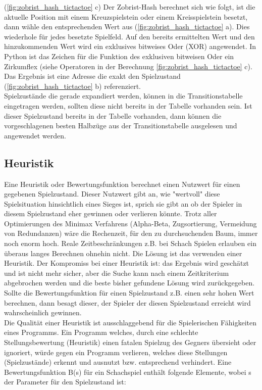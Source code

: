 (\ref{fig:zobrist_hash_tictactoe} c) Der Zobrist-Hash berechnet sich wie folgt, ist die aktuelle Position mit einem Kreuzspielstein oder einem Kreisspielstein besetzt, dann wähle den entsprechenden Wert aus (\ref{fig:zobrist_hash_tictactoe} a). Dies wiederhole für jedes besetzte Spielfeld. Auf den bereits ermittelten Wert und den hinzukommenden Wert wird ein exklusives bitweises Oder (XOR) angewendet. In Python ist das Zeichen für die Funktion des exklusiven bitweisen Oder ein Zirkumflex (siehe Operatoren in der Berechnung \ref{fig:zobrist_hash_tictactoe} c). Das Ergebnis ist eine Adresse die exakt den Spielzustand (\ref{fig:zobrist_hash_tictactoe} b) referenziert. \\

Spielzustände die gerade expandiert werden, können in die Transitionstabelle eingetragen werden, sollten diese nicht bereits in der Tabelle vorhanden sein. Ist dieser Spielzustand bereits in der Tabelle vorhanden, dann können die vorgeschlagenen besten Halbzüge aus der Transitionstabelle ausgelesen und angewendet werden. \\

\subsection{Heuristik}
Eine Heuristik oder Bewertungsfunktion berechnet einen Nutzwert für einen gegebenen Spielzustand. Dieser Nutzwert gibt an, wie "wertvoll" diese Spielsituation hinsichtlich eines Sieges ist, sprich sie gibt an ob der Spieler in diesem Spielzustand eher gewinnen oder verlieren könnte. Trotz aller Optimierungen des Minimax Verfahrens (Alpha-Beta, Zugsortierung, Vermeidung von Redundanzen) wäre die Rechenzeit, für den zu durchsuchenden Baum, immer noch enorm hoch. Reale Zeitbeschränkungen z.B. bei Schach Spielen erlauben ein überaus langes Berechnen ohnehin nicht. Die Lösung ist das verwenden einer Heuristik. Der Kompromiss bei einer Heuristik ist: das Ergebnis wird geschätzt und ist nicht mehr sicher, aber die Suche kann nach einem Zeitkriterium abgebrochen werden und die beste bisher gefundene Lösung wird zurückgegeben. Sollte die Bewertungsfunktion für einen Spielzustand z.B. einen sehr hohen Wert berechnen, dann besagt dieser, der Spieler der diesen Spielzustand erreicht wird wahrscheinlich gewinnen. \\

Die Qualität einer Heuristik ist ausschlaggebend für die Spielerischen Fähigkeiten eines Programms. Ein Programm welches, durch eine schlechte Stellungsbewertung (Heuristik) einen fatalen Spielzug des Gegners übersieht oder ignoriert, würde gegen ein Programm verlieren, welches diese Stellungen (Spielzustände) erkennt und ausnutzt bzw. entsprechend verhindert. Eine Bewertungsfunktion B(s) für ein Schachspiel enthält folgende Elemente, wobei s der Parameter für den Spielzustand ist\cite[119]{Ertel}: \\

